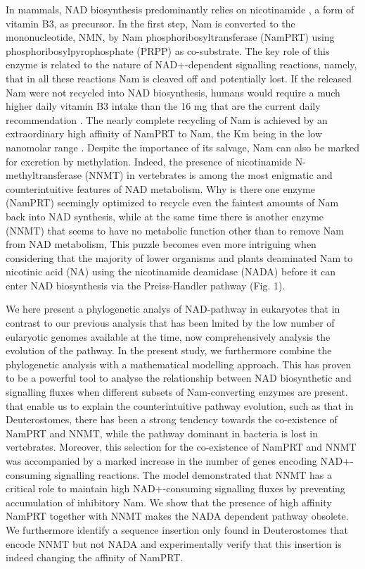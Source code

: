 In mammals, NAD biosynthesis predominantly relies on nicotinamide , a form of vitamin B3, as precursor. In the first step, Nam is converted to the mononucleotide, NMN, by Nam phosphoribosyltransferase (NamPRT) using phosphoribosylpyrophosphate (PRPP) as co-substrate. The key role of this enzyme is related to the nature of NAD+-dependent signalling reactions, namely, that in all these reactions Nam is cleaved off and potentially lost. If the released Nam were not recycled into NAD biosynthesis, humans would require a much higher daily vitamin B3 intake than the 16 mg that are the current daily recommendation \cite{CommissionofEuropeanCommunities2008}. The nearly complete recycling of Nam is achieved by an extraordinary high affinity of NamPRT to Nam, the Km being in the low nanomolar range \cite{Burgos2008}. Despite the importance of its salvage, Nam can also be marked for excretion by methylation. Indeed, the presence of nicotinamide N-methyltransferase (NNMT) in vertebrates \cite{Gossmann2012} is among the most enigmatic and counterintuitive features of NAD metabolism. Why is there one enzyme (NamPRT) seemingly optimized to recycle even the faintest amounts of Nam back into NAD synthesis, while at the same time there is another enzyme (NNMT) that seems to have no metabolic function other than to remove Nam from NAD metabolism, This puzzle becomes even more intriguing when considering that the majority of lower organisms and plants deaminated Nam to nicotinic acid (NA) using the nicotinamide deamidase (NADA) before it can enter NAD biosynthesis via the Preiss-Handler pathway (Fig. 1).

We here present a phylogenetic analys of NAD-pathway in eukaryotes that in contrast to our previous analysis that has been lmited by the low number of eularyotic genomes available at the time, now comprehensively analysis the evolution of the pathway. In the present study, we furthermore combine the phylogenetic analysis with a mathematical modelling approach. This has proven to be a powerful tool to analyse the relationship between NAD biosynthetic and signalling fluxes when different subsets of Nam-converting enzymes are present. that enable us to explain the counterintuitive pathway evolution, such as that in Deuterostomes, there has been a strong tendency towards the co-existence of NamPRT and NNMT, while the pathway dominant in bacteria is lost in vertebrates. Moreover, this selection for the co-existence of NamPRT and NNMT was accompanied by a marked increase in the number of genes encoding NAD+-consuming signalling reactions. The model demonstrated that NNMT has a critical role to maintain high NAD+-consuming signalling fluxes by preventing accumulation of inhibitory Nam. We show that the presence of high affinity NamPRT together with NNMT makes the NADA dependent pathway obsolete. We furthermore identify a sequence insertion only found in Deuterostomes that encode NNMT but not NADA and experimentally verify that this insertion is indeed changing the affinity of NamPRT.

